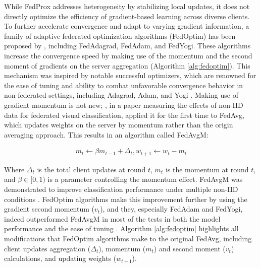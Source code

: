 While FedProx addresses heterogeneity by stabilizing local updates, it does not directly optimize the efficiency of gradient-based learning across diverse clients. To further accelerate convergence and adapt to varying gradient information, a family of adaptive federated optimization algorithms (FedOptim) has been proposed by \cite{fedoptim}, including FedAdagrad, FedAdam, and FedYogi. These algorithms increase the convergence speed by making use of the momentum and the second moment of gradients on the server aggregation (Algorithm \ref{alg:fedoptim}). This mechanism was inspired by notable successful optimizers, which are renowned for the ease of tuning and ability to combat unfavorable convergence behavior in non-federated settings, including Adagrad, Adam, and Yogi \citep{fedoptim}. Making use of gradient momentum is not new; \cite{fedavgm}, in a paper measuring the effects of non-IID data for federated visual classification, applied it for the first time to FedAvg, which updates weights on the server by momentum rather than the origin averaging approach. This results in an algorithm called FedAvgM:

\begin{align}
m_t \gets \beta m_{t-1} + \Delta_t, w_{t+1} \gets w_t - m_t
\end{align}

Where $\Delta_t$ is the total client updates at round $t$, $m_{t}$ is the momentum at round $t$, and $\beta \in [0, 1)$ is a parameter controlling the momentum effect. FedAvgM was demonstrated to improve classification performance under multiple non-IID conditions \citep{fedavgm}. FedOptim algorithms make this improvement further by using the gradient second momentum ($v_t$), and they, especially FedAdam and FedYogi, indeed outperformed FedAvgM in most of the tests in both the model performance and the ease of tuning \citep{fedoptim}. Algorithm \ref{alg:fedoptim} highlights all modifications that FedOptim algorithms make to the original FedAvg, including client updates aggregation ($\Delta_t$), momentum ($m_t$) and second moment ($v_t$) calculations, and updating weights ($w_{t+1}$).

